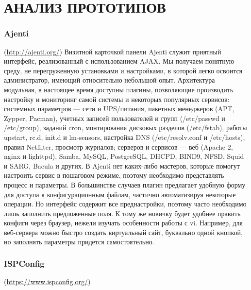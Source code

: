 \section{АНАЛИЗ ПРОТОТИПОВ}
\label{sec:solution}

\subsubsection{Ajenti}(\url{http://ajenti.org/}) Визитной карточкой панели Ajenti служит приятный интерфейс, реализованный с использованием AJAX. Мы получаем понятную среду, не перегруженную установками и настройками, в которой легко освоится администратор, имеющий относительно небольшой опыт. Архитектура модульная, в настоящее время доступны плагины, позволяющие производить настройку и мониторинг самой системы и некоторых популярных сервисов:
системных параметров — сети и UPS/питания, пакетных менеджеров (APT, Zypper, Pacman), учетных записей пользователей и групп (/etc/passwd и /etc/group), заданий cron, монтирования дисковых разделов (/etc/fstab), работы upstart, rc.d, init.d и lm-sensors, настройка DNS (/etc/resolv.conf и /etc/hosts), правил Netfilter, просмотр журналов;
серверов и сервисов — веб (Apache 2, nginx и lighttpd), Samba, MySQL, PostgreSQL, DHCPD, BIND9, NFSD, Squid и SARG, Bacula и других.
В Ajenti нет каких-либо мастеров, которые помогут настроить сервис в пошаговом режиме, поэтому необходимо представлять процесс и параметры. В большинстве случаев плагин предлагает удобную форму для доступа к конфигурационным файлам, частично автоматизируя некоторые операции. Но интерфейс содержит все преднастройки, поэтому часто необходимо лишь заполнить предложенные поля. К тому же новичку будет удобнее править конфиги через браузер, нежели изучать особенности работы с vi. Например, для веб-сервера можно быстро создать виртуальный сайт, буквально одной кнопкой, но заполнять параметры придется самостоятельно.

\subsubsection{ISPConfig}(\url{https://www.ispconfig.org/}) 

